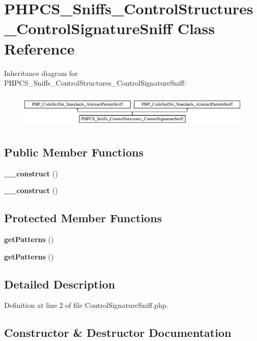 \section{P\+H\+P\+C\+S\+\_\+\+Sniffs\+\_\+\+Control\+Structures\+\_\+\+Control\+Signature\+Sniff Class Reference}
\label{class_p_h_p_c_s___sniffs___control_structures___control_signature_sniff}
Inheritance diagram for P\+H\+P\+C\+S\+\_\+\+Sniffs\+\_\+\+Control\+Structures\+\_\+\+Control\+Signature\+Sniff\+:\begin{figure}[H]
\begin{center}
\leavevmode
\includegraphics[height=1.671642cm]{class_p_h_p_c_s___sniffs___control_structures___control_signature_sniff}
\end{center}
\end{figure}
\subsection*{Public Member Functions}
\begin{DoxyCompactItemize}
\item 
{\bf \+\_\+\+\_\+construct} ()
\item 
{\bf \+\_\+\+\_\+construct} ()
\end{DoxyCompactItemize}
\subsection*{Protected Member Functions}
\begin{DoxyCompactItemize}
\item 
{\bf get\+Patterns} ()
\item 
{\bf get\+Patterns} ()
\end{DoxyCompactItemize}


\subsection{Detailed Description}


Definition at line 2 of file Control\+Signature\+Sniff.\+php.



\subsection{Constructor \& Destructor Documentation}
